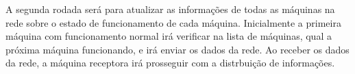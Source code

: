 A segunda rodada será para atualizar as informações de todas as máquinas na rede sobre o estado de funcionamento de cada máquina. Inicialmente a primeira máquina com funcionamento normal 
irá verificar na lista de máquinas, qual a próxima máquina funcionando, e irá enviar os dados da rede. Ao receber os dados da rede, a máquina receptora irá prosseguir com a distrbuição 
de informações.